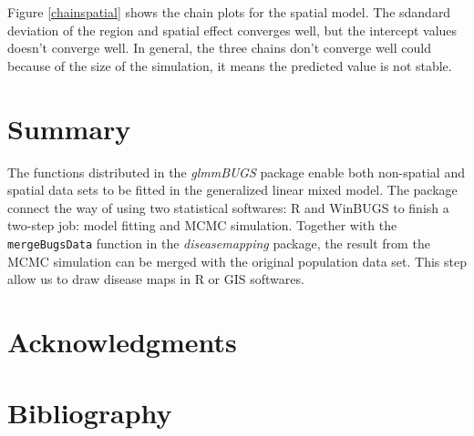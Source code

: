 \documentclass{article}
\begin{document}
Figure \ref{chainspatial} shows the chain plots for the spatial model. The sdandard deviation of the region and spatial effect converges well, but the intercept values doesn't converge well. In general, the three chains don't converge well could because of the size of the simulation, it means the predicted value is not stable.

\section{Summary}
The functions distributed in the \textit{glmmBUGS} package enable both non-spatial and spatial data sets to be fitted in the generalized linear mixed model. The package connect the way of using two statistical softwares: R and WinBUGS to finish a two-step job: model fitting and MCMC simulation. 
Together with the \verb!mergeBugsData! function in the \textit{diseasemapping} package, the result from the MCMC simulation can be merged with the original population data set. This step allow us to draw disease maps in R or GIS softwares. 

\section{Acknowledgments}


\section{Bibliography}
\end{document}
